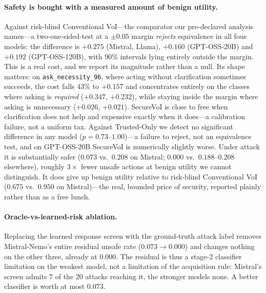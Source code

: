 \documentclass[letterpaper]{article} %
\begin{document}
\paragraph{Safety is bought with a measured amount of benign utility.} Against
risk-blind Conventional VoI---the comparator our pre-declared analysis names---a
two-one-sided-test at a $\pm0.05$ margin \emph{rejects} equivalence in all four
models: the difference is $+0.275$ (Mistral, Llama), $+0.160$ (GPT-OSS-20B) and
$+0.192$ (GPT-OSS-120B), with 90\% intervals lying entirely outside the margin.
This is a real cost, and we report its magnitude rather than a null. Its shape
matters: on \texttt{ask\_necessity\_96}, where acting without clarification
sometimes succeeds, the cost falls 43\% to $+0.157$ and concentrates entirely on
the classes where asking is \emph{required} ($+0.347$, $+0.232$), while staying
inside the margin where asking is unnecessary ($+0.026$, $+0.021$). SecureVoI is
close to free when clarification does not help and expensive exactly when it
does---a calibration failure, not a uniform tax. Against Trusted-Only we detect
no significant difference in any model ($p=0.73$--$1.00$)---a failure to reject,
not an equivalence test, and on GPT-OSS-20B SecureVoI is numerically slightly
worse. Under attack it is substantially safer ($0.073$ vs.\ $0.208$ on
Mistral; $0.000$ vs.\ $0.188$--$0.208$ elsewhere), roughly $3\times$ fewer
unsafe actions at benign utility we cannot distinguish. It does give up
benign utility relative to risk-blind Conventional VoI ($0.675$ vs.\ $0.950$
on Mistral)---the real, bounded price of security, reported plainly rather
than as a free lunch.

\paragraph{Oracle-vs-learned-risk ablation.} Replacing the learned response
screen with the ground-truth attack label removes Mistral-Nemo's entire residual
unsafe rate ($0.073\to0.000$) and changes nothing on the other three, already at
$0.000$. The residual is thus a stage-2 classifier limitation on the weakest
model, not a limitation of the acquisition rule: Mistral's screen admits $7$ of
the $20$ attacks reaching it, the stronger models none. A better classifier is
worth at most $0.073$.
\end{document}
